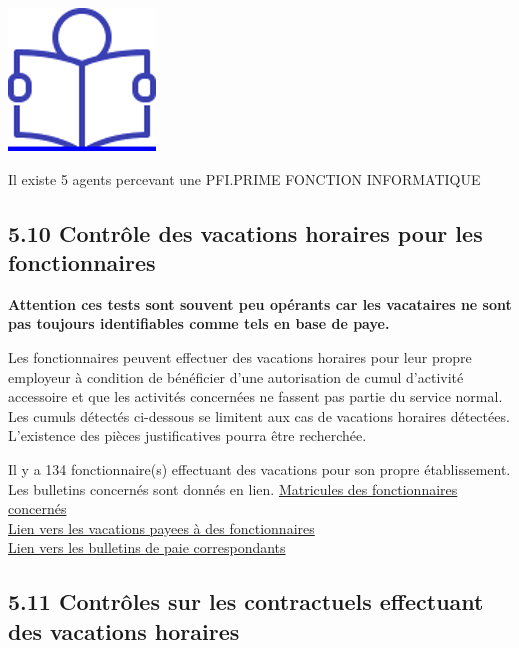 \href{../Docs/Notices/fiche_PFI.odt}{\includegraphics{icones/Notice.png}}

Il existe 5 agents percevant une PFI.PRIME FONCTION INFORMATIQUE

\hypertarget{controle-des-vacations-horaires-pour-les-fonctionnaires}{%
\subsection{5.10 Contrôle des vacations horaires pour les
fonctionnaires}\label{controle-des-vacations-horaires-pour-les-fonctionnaires}}

\textbf{Attention ces tests sont souvent peu opérants car les vacataires
ne sont pas toujours identifiables comme tels en base de paye.}

Les fonctionnaires peuvent effectuer des vacations horaires pour leur
propre employeur à condition de bénéficier d'une autorisation de cumul
d'activité accessoire et que les activités concernées ne fassent pas
partie du service normal. Les cumuls détectés ci-dessous se limitent aux
cas de vacations horaires détectées. L'existence des pièces
justificatives pourra être recherchée.

Il y a 134 fonctionnaire(s) effectuant des vacations pour son propre
établissement. Les bulletins concernés sont donnés en lien.
\href{../Bases/Reglementation/matricules.fonctionnaires.et.vacations.csv}{Matricules
des fonctionnaires concernés}\\
\href{../Bases/Reglementation/lignes.fonctionnaires.et.vacations.csv}{Lien
vers les vacations payees à des fonctionnaires}\\
\href{../Bases/Reglementation/Paie_vac_fonct.csv}{Lien vers les bulletins
de paie correspondants}

\hypertarget{controles-sur-les-contractuels-effectuant-des-vacations-horaires}{%
\subsection{5.11 Contrôles sur les contractuels effectuant des vacations
horaires}\label{controles-sur-les-contractuels-effectuant-des-vacations-horaires}}

